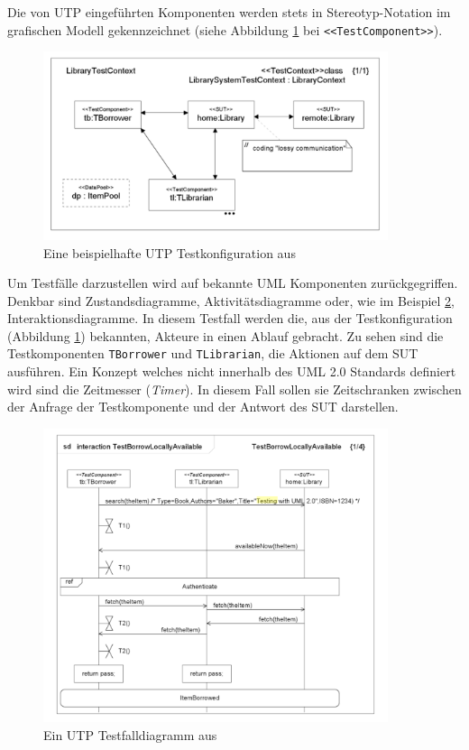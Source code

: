 Die von \Gls{UTP} eingeführten Komponenten werden stets in Stereotyp-Notation im grafischen Modell gekennzeichnet (siehe Abbildung \ref{fig:utp_config} bei \texttt{<<TestComponent>>}).

\begin{figure}[h] 
  \centering
     \includegraphics[width=0.9\textwidth]{figures/utp_config.png}
  \caption{Eine beispielhafte UTP Testkonfiguration aus  \cite{_model-driven_2007}}
  \label{fig:utp_config}
\end{figure}

Um Testfälle darzustellen wird auf bekannte \Gls{UML} Komponenten zurückgegriffen. Denkbar sind Zustandsdiagramme, Aktivitätsdiagramme oder, wie im Beispiel \ref{fig:utp_case}, Interaktionsdiagramme. In diesem Testfall werden die, aus der Testkonfiguration (Abbildung \ref{fig:utp_config}) bekannten, Akteure in einen Ablauf gebracht. Zu sehen sind die Testkomponenten \texttt{TBorrower} und \texttt{TLibrarian}, die Aktionen auf dem \Gls{SUT} ausführen. Ein Konzept welches nicht innerhalb des \Gls{UML} 2.0 Standards definiert wird sind die Zeitmesser (\textit{Timer}). In diesem Fall sollen sie Zeitschranken zwischen der Anfrage der Testkomponente und der Antwort des \Gls{SUT} darstellen.

\begin{figure}[h] 
  \centering
     \includegraphics[width=0.9\textwidth]{figures/utp_case.png}
  \caption{Ein UTP Testfalldiagramm aus  \cite{_model-driven_2007}}
  \label{fig:utp_case}
\end{figure}

